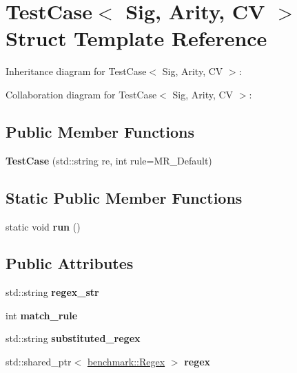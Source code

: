 \hypertarget{struct_test_case}{}\section{Test\+Case$<$ Sig, Arity, CV $>$ Struct Template Reference}
\label{struct_test_case}


Inheritance diagram for Test\+Case$<$ Sig, Arity, CV $>$\+:


Collaboration diagram for Test\+Case$<$ Sig, Arity, CV $>$\+:
\subsection*{Public Member Functions}
\begin{DoxyCompactItemize}
\item 
\mbox{\label{struct_test_case_aeb84734410b251a2b8354c393b4e6471}} 
{\bfseries Test\+Case} (std\+::string re, int rule=M\+R\+\_\+\+Default)
\end{DoxyCompactItemize}
\subsection*{Static Public Member Functions}
\begin{DoxyCompactItemize}
\item 
\mbox{\label{struct_test_case_aa653a05d97530c1f32da2309661d4cf3}} 
static void {\bfseries run} ()
\end{DoxyCompactItemize}
\subsection*{Public Attributes}
\begin{DoxyCompactItemize}
\item 
\mbox{\label{struct_test_case_a42999fb78509981811283961683fd9c3}} 
std\+::string {\bfseries regex\+\_\+str}
\item 
\mbox{\label{struct_test_case_a1d01390a2d4ba2a9ca1feb90fdcf3ef8}} 
int {\bfseries match\+\_\+rule}
\item 
\mbox{\label{struct_test_case_add30fa40171f6bcfd0a3cc0b884a1563}} 
std\+::string {\bfseries substituted\+\_\+regex}
\item 
\mbox{\label{struct_test_case_a6ff68bed7c191344f00e96f95b967310}} 
std\+::shared\+\_\+ptr$<$ \mbox{\hyperlink{classbenchmark_1_1_regex}{benchmark\+::\+Regex}} $>$ {\bfseries regex}
\end{DoxyCompactItemize}


